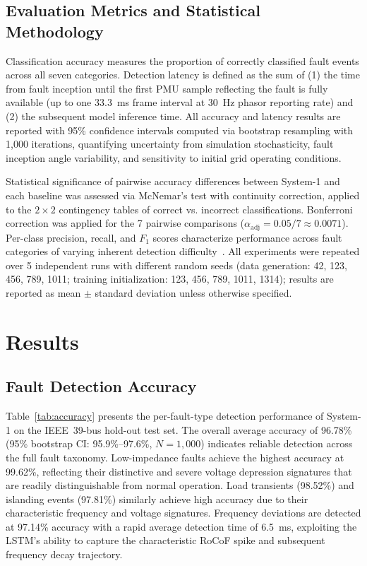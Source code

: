 \documentclass[journal]{IEEEtran}
\begin{document}
\subsection{Evaluation Metrics and Statistical Methodology}

Classification accuracy measures the proportion of correctly classified fault events across all seven categories. Detection latency is defined as the sum of (1) the time from fault inception until the first PMU sample reflecting the fault is fully available (up to one 33.3~ms frame interval at 30~Hz phasor reporting rate) and (2) the subsequent model inference time. All accuracy and latency results are reported with 95\% confidence intervals computed via bootstrap resampling with 1,000 iterations, quantifying uncertainty from simulation stochasticity, fault inception angle variability, and sensitivity to initial grid operating conditions.

Statistical significance of pairwise accuracy differences between System-1 and each baseline was assessed via McNemar's test with continuity correction, applied to the $2 \times 2$ contingency tables of correct vs. incorrect classifications. Bonferroni correction was applied for the 7 pairwise comparisons ($\alpha_{\text{adj}} = 0.05/7 \approx 0.0071$). Per-class precision, recall, and $F_1$ scores characterize performance across fault categories of varying inherent detection difficulty~\cite{ref36,ref42}. All experiments were repeated over 5 independent runs with different random seeds (data generation: 42, 123, 456, 789, 1011; training initialization: 123, 456, 789, 1011, 1314); results are reported as mean $\pm$ standard deviation unless otherwise specified.

\section{Results}
\label{sec:results}

\subsection{Fault Detection Accuracy}

Table~\ref{tab:accuracy} presents the per-fault-type detection performance of System-1 on the IEEE~39-bus hold-out test set. The overall average accuracy of 96.78\% (95\% bootstrap CI: 95.9\%--97.6\%, $N = 1,000$) indicates reliable detection across the full fault taxonomy. Low-impedance faults achieve the highest accuracy at 99.62\%, reflecting their distinctive and severe voltage depression signatures that are readily distinguishable from normal operation. Load transients (98.52\%) and islanding events (97.81\%) similarly achieve high accuracy due to their characteristic frequency and voltage signatures. Frequency deviations are detected at 97.14\% accuracy with a rapid average detection time of 6.5~ms, exploiting the LSTM's ability to capture the characteristic RoCoF spike and subsequent frequency decay trajectory.
\end{document}
